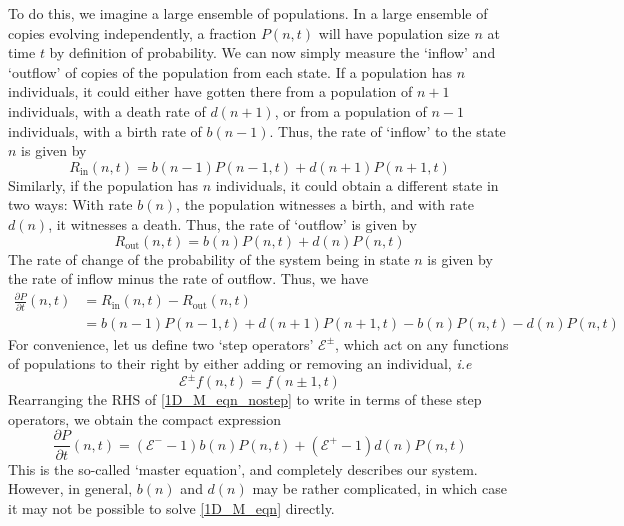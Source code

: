 To do this, we imagine a large ensemble of populations. In a large ensemble of copies evolving independently, a fraction $P(n,t)$ will have population size $n$ at time $t$ by definition of probability. We can now simply measure the `inflow' and `outflow' of copies of the population from each state. If a population has $n$ individuals, it could either have gotten there from a population of $n+1$ individuals, with a death rate of $d(n+1)$, or from a population of $n-1$ individuals, with a birth rate of $b(n-1)$. Thus, the rate of `inflow' to the state $n$ is given by
\begin{equation}
    \label{1D_rate_in}
    R_{\textrm{in}}(n,t) = b(n-1)P(n-1,t) + d(n+1)P(n+1,t)
\end{equation}
Similarly, if the population has $n$ individuals, it could obtain a different state in two ways: With rate $b(n)$, the population witnesses a birth, and with rate $d(n)$, it witnesses a death. Thus, the rate of `outflow' is given by
\begin{equation}
    \label{1D_rate_out}
    R_{\textrm{out}}(n,t) = b(n)P(n,t) + d(n)P(n,t)
\end{equation}
The rate of change of the probability of the system being in state $n$ is given by the rate of inflow minus the rate of outflow. Thus, we have
\begin{align}
    \frac{\partial P}{\partial t}(n,t) &= R_{\textrm{in}}(n,t) - R_{\textrm{out}}(n,t)\nonumber\\
    &= b(n-1)P(n-1,t) + d(n+1)P(n+1,t) - b(n)P(n,t) - d(n)P(n,t)\label{1D_M_eqn_nostep}
\end{align}
For convenience, let us define two `step operators' $\mathcal{E}^{\pm}$, which act on any functions of populations to their right by either adding or removing an individual, \textit{i.e}
\begin{equation*}
    \mathcal{E}^{\pm}f(n,t) = f(n \pm 1,t)
\end{equation*}
Rearranging the RHS of \eqref{1D_M_eqn_nostep} to write in terms of these step operators, we obtain the compact expression
\begin{equation}
\label{1D_M_eqn}
\frac{\partial P}{\partial t}(n,t) = (\mathcal{E}^{-}-1)b(n)P(n,t) + (\mathcal{E}^{+}-1)d(n)P(n,t)
\end{equation}
This is the so-called `master equation', and completely describes our system. However, in general, $b(n)$ and $d(n)$ may be rather complicated, in which case it may not be possible to solve \eqref{1D_M_eqn} directly.

